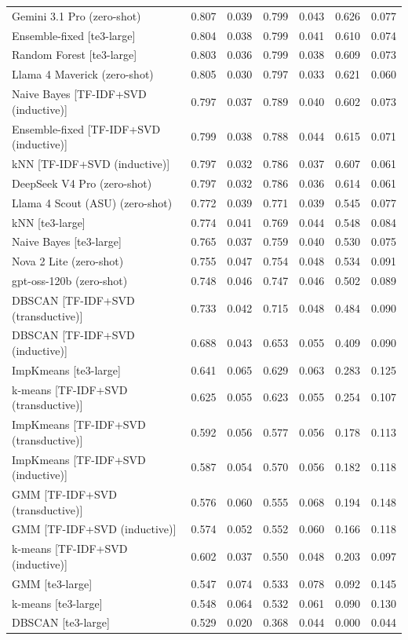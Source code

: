 \begin{table}[htbp]
\begin{tabular}{lcccccc}
Gemini 3.1 Pro (zero-shot) & 0.807 & 0.039 & 0.799 & 0.043 & 0.626 & 0.077 \\
Ensemble-fixed [te3-large] & 0.804 & 0.038 & 0.799 & 0.041 & 0.610 & 0.074 \\
Random Forest [te3-large] & 0.803 & 0.036 & 0.799 & 0.038 & 0.609 & 0.073 \\
Llama 4 Maverick (zero-shot) & 0.805 & 0.030 & 0.797 & 0.033 & 0.621 & 0.060 \\
Naive Bayes [TF-IDF+SVD (inductive)] & 0.797 & 0.037 & 0.789 & 0.040 & 0.602 & 0.073 \\
Ensemble-fixed [TF-IDF+SVD (inductive)] & 0.799 & 0.038 & 0.788 & 0.044 & 0.615 & 0.071 \\
kNN [TF-IDF+SVD (inductive)] & 0.797 & 0.032 & 0.786 & 0.037 & 0.607 & 0.061 \\
DeepSeek V4 Pro (zero-shot) & 0.797 & 0.032 & 0.786 & 0.036 & 0.614 & 0.061 \\
Llama 4 Scout (ASU) (zero-shot) & 0.772 & 0.039 & 0.771 & 0.039 & 0.545 & 0.077 \\
kNN [te3-large] & 0.774 & 0.041 & 0.769 & 0.044 & 0.548 & 0.084 \\
Naive Bayes [te3-large] & 0.765 & 0.037 & 0.759 & 0.040 & 0.530 & 0.075 \\
Nova 2 Lite (zero-shot) & 0.755 & 0.047 & 0.754 & 0.048 & 0.534 & 0.091 \\
gpt-oss-120b (zero-shot) & 0.748 & 0.046 & 0.747 & 0.046 & 0.502 & 0.089 \\
DBSCAN [TF-IDF+SVD (transductive)] & 0.733 & 0.042 & 0.715 & 0.048 & 0.484 & 0.090 \\
DBSCAN [TF-IDF+SVD (inductive)] & 0.688 & 0.043 & 0.653 & 0.055 & 0.409 & 0.090 \\
ImpKmeans [te3-large] & 0.641 & 0.065 & 0.629 & 0.063 & 0.283 & 0.125 \\
k-means [TF-IDF+SVD (transductive)] & 0.625 & 0.055 & 0.623 & 0.055 & 0.254 & 0.107 \\
ImpKmeans [TF-IDF+SVD (transductive)] & 0.592 & 0.056 & 0.577 & 0.056 & 0.178 & 0.113 \\
ImpKmeans [TF-IDF+SVD (inductive)] & 0.587 & 0.054 & 0.570 & 0.056 & 0.182 & 0.118 \\
GMM [TF-IDF+SVD (transductive)] & 0.576 & 0.060 & 0.555 & 0.068 & 0.194 & 0.148 \\
GMM [TF-IDF+SVD (inductive)] & 0.574 & 0.052 & 0.552 & 0.060 & 0.166 & 0.118 \\
k-means [TF-IDF+SVD (inductive)] & 0.602 & 0.037 & 0.550 & 0.048 & 0.203 & 0.097 \\
GMM [te3-large] & 0.547 & 0.074 & 0.533 & 0.078 & 0.092 & 0.145 \\
k-means [te3-large] & 0.548 & 0.064 & 0.532 & 0.061 & 0.090 & 0.130 \\
DBSCAN [te3-large] & 0.529 & 0.020 & 0.368 & 0.044 & 0.000 & 0.044 \\
\bottomrule
\end{tabular}
\end{table}